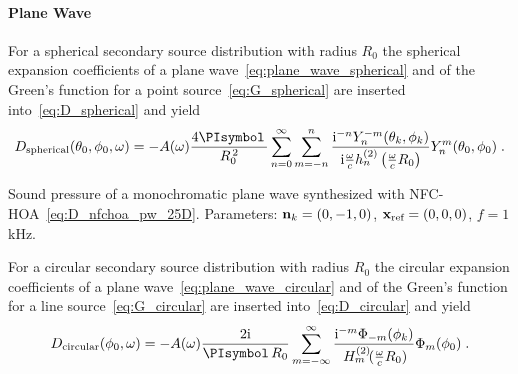 \paragraph{Plane Wave}
%
%
For a spherical secondary source distribution with radius $R_0$ the spherical
expansion coefficients of a
plane wave~\eqref{eq:plane_wave_spherical} and of the Green's
function for a point source~\eqref{eq:G_spherical} are inserted
into~\eqref{eq:D_spherical} and yield\autocite[][(96)]{Schultz2014}
%
\begin{equation}
    D_\text{spherical}(\theta_0,\phi_0,\omega) = -A(\omega) \frac{4\PI}{R_0^{\,2}}
    \sum_{n=0}^\infty \sum_{m=-n}^n \frac{\I^{-n} Y_n^{-m}(\theta_k,\phi_k)}{\I\omegac h_n^{(2)}
    \left(\omegac R_0\right)} Y_n^m(\theta_0,\phi_0) \qp
    \label{eq:D_nfchoa_pw_3D}
\end{equation}
%
\begin{marginfigure}
    \centering
    \ft
    
    \caption{Sound pressure of a monochromatic plane wave synthesized with
        \twohalfD \ac{NFC-HOA}~\eqref{eq:D_nfchoa_pw_25D}. Parameters: $\mathbf{n}_k = (0,-1,0)$,
        $\mathbf{x}_\text{ref} = (0,0,0)$, $f = 1$\,kHz.
        }
\end{marginfigure}
%
For a circular secondary source distribution with radius $R_0$ the circular
expansion coefficients of a plane wave~\eqref{eq:plane_wave_circular} and
of the Green's function for a line source~\eqref{eq:G_circular} are
inserted into~\eqref{eq:D_circular} and
yield
%
\begin{equation}
    D_\text{circular}(\phi_0,\omega) = -A(\omega) \frac{2\I}{\PI R_0}
    \sum_{m=-\infty}^\infty \frac{\I^{-m}\Phi_{-m}(\phi_k)}
    {\H{m}{2}(\omegac R_0)} \Phi_m(\phi_0) \qp
    \label{eq:D_nfchoa_pw_2D}
\end{equation}
%

